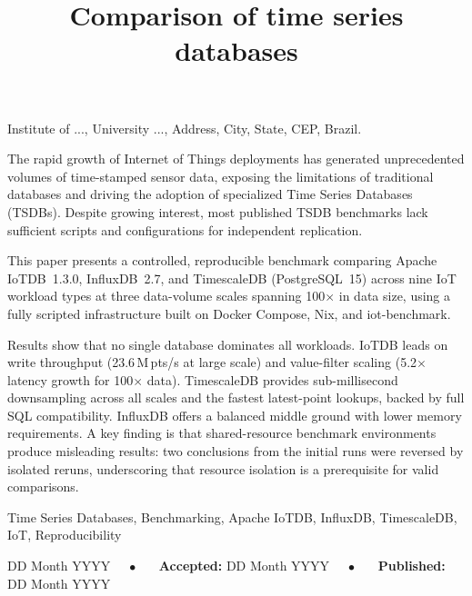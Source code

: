 \documentclass[english]{presets/sbcreviews-2025}%
\title[Comparison of time series databases]{Comparison of time series databases}
\author[Klein et al. 202X]{
\affil{\textbf{Luiz Fernando Klein}~\orcidlink{0000-0000-0000-0000}~\textcolor{blue}{\faEnvelope}~~[{Universidade Federal}~|\href{mailto: ...}{~{\textit{luizkleinfernando@gmail.com}}}~]}
}
\begin{document}
\begin{frontmatter}

\maketitle

\begin{mail}
Institute of ..., University ..., Address, City, State, CEP, Brazil.
\end{mail}


\begin{abstract-en}
The rapid growth of Internet of Things deployments has generated unprecedented volumes of
time-stamped sensor data, exposing the limitations of traditional databases and driving the
adoption of specialized Time Series Databases (TSDBs). Despite growing interest, most published
TSDB benchmarks lack sufficient scripts and configurations for independent replication.

This paper presents a controlled, reproducible benchmark comparing Apache IoTDB~1.3.0,
InfluxDB~2.7, and TimescaleDB (PostgreSQL~15) across nine IoT workload types at three
data-volume scales spanning 100$\times$ in data size, using a fully scripted infrastructure
built on Docker Compose, Nix, and iot-benchmark.

Results show that no single database dominates all workloads. IoTDB leads on write throughput
(23.6\,M\,pts/s at large scale) and value-filter scaling (5.2$\times$ latency growth for
100$\times$ data). TimescaleDB provides sub-millisecond downsampling across all scales and the
fastest latest-point lookups, backed by full SQL compatibility. InfluxDB offers a balanced
middle ground with lower memory requirements. A key finding is that shared-resource benchmark
environments produce misleading results: two conclusions from the initial runs were reversed
by isolated reruns, underscoring that resource isolation is a prerequisite for valid comparisons.
\end{abstract-en}

\begin{keywords}
Time Series Databases, Benchmarking, Apache IoTDB, InfluxDB, TimescaleDB, IoT, Reproducibility
\end{keywords}

\begin{dates}
 DD Month YYYY~~~$\bullet$~~~
{\sffamily\textbf{Accepted:}} DD Month YYYY~~~$\bullet$~~~
{\sffamily\textbf{Published:}} DD Month YYYY

\end{dates}



\end{frontmatter}
\end{document}
